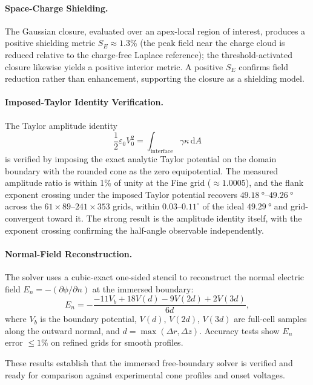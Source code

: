 \paragraph{Space-Charge Shielding.} The Gaussian closure, evaluated over an apex-local region of interest, produces a positive shielding metric $S_E \approx 1.3\%$ (the peak field near the charge cloud is reduced relative to the charge-free Laplace reference); the threshold-activated closure likewise yields a positive interior metric. A positive $S_E$ confirms field reduction rather than enhancement, supporting the closure as a shielding model.

\paragraph{Imposed-Taylor Identity Verification.} The Taylor amplitude identity
\begin{equation}
\frac{1}{2}\varepsilon_0 V_0^2 = \int_{\text{interface}} \gamma \kappa \, \mathrm{d}A
\end{equation}
is verified by imposing the exact analytic Taylor potential on the domain boundary with the rounded cone as the zero equipotential. The measured amplitude ratio is within 1\% of unity at the Fine grid ($\approx 1.0005$), and the flank exponent crossing under the imposed Taylor potential recovers $\SI{49.18}{\degree}$--$\SI{49.26}{\degree}$ across the $61\times89$--$241\times353$ grids, within $0.03$--$0.11^{\circ}$ of the ideal $\SI{49.29}{\degree}$ and grid-convergent toward it. The strong result is the amplitude identity itself, with the exponent crossing confirming the half-angle observable independently.

\paragraph{Normal-Field Reconstruction.} The solver uses a cubic-exact one-sided stencil to reconstruct the normal electric field $E_n = -(\partial \phi / \partial n)$ at the immersed boundary:
\begin{equation}
E_n = -\frac{-11V_b + 18V(d) - 9V(2d) + 2V(3d)}{6d},
\end{equation}
where $V_b$ is the boundary potential, $V(d)$, $V(2d)$, $V(3d)$ are full-cell samples along the outward normal, and $d = \max(\Delta r, \Delta z)$. Accuracy tests show $E_n$ error $\leq 1\%$ on refined grids for smooth profiles.

These results establish that the immersed free-boundary solver is verified and ready for comparison against experimental cone profiles and onset voltages.
